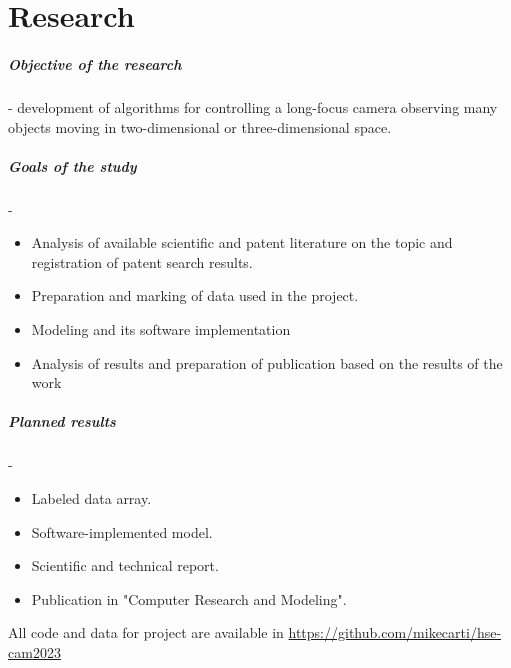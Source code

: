 \chapter*{Research}

\paragraph{Objective of the research} - development of algorithms for controlling a long-focus camera observing many objects moving in two-dimensional or three-dimensional space.


\paragraph{Goals of the study} - 

\begin{itemize}
    \item Analysis of available scientific and patent literature on the topic and registration of patent search results.
    \item Preparation and marking of data used in the project.
    \item Modeling and its software implementation
    \item Analysis of results and preparation of publication based on the results of the work
\end{itemize}


\paragraph{Planned results} - 

\begin{itemize}
    \item Labeled data array.
    \item Software-implemented model.
    \item Scientific and technical report.
    \item Publication in "Computer Research and Modeling".
    
\end{itemize}

All code and data for project are available in \href{https://github.com/mikecarti/hse-cam2023}{https://github.com/mikecarti/hse-cam2023}